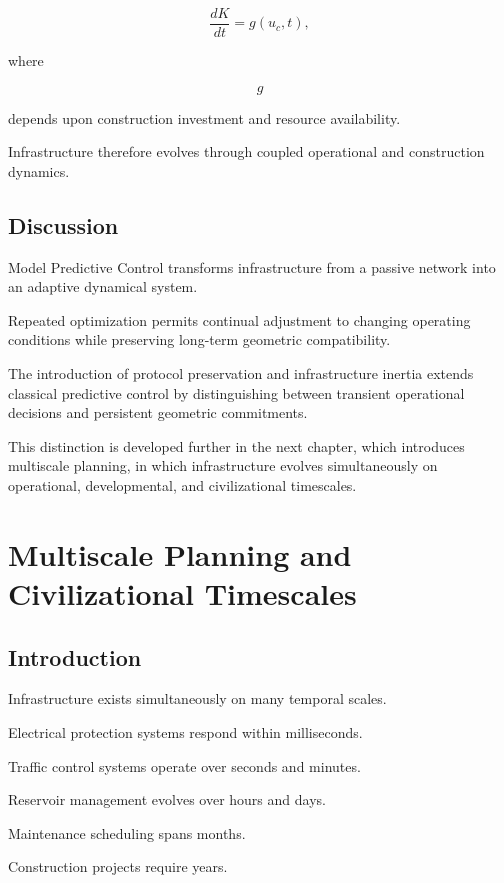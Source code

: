 \documentclass[11pt,fleqn]{book}
\numberwithin{equation}{chapter}
\theoremstyle{plain}
\theoremstyle{definition}
\theoremstyle{remark}
\begin{document}
\[
\frac{dK}{dt}
=
g(u_c,t),
\]

where

\[
g
\]

depends upon construction investment and resource availability.

Infrastructure therefore evolves through coupled operational and
construction dynamics.


\section{Discussion}

Model Predictive Control transforms infrastructure from a passive network
into an adaptive dynamical system.

Repeated optimization permits continual adjustment to changing operating
conditions while preserving long-term geometric compatibility.

The introduction of protocol preservation and infrastructure inertia
extends classical predictive control by distinguishing between transient
operational decisions and persistent geometric commitments.

This distinction is developed further in the next chapter, which introduces
multiscale planning, in which infrastructure evolves simultaneously on
operational, developmental, and civilizational timescales.

\chapter{Multiscale Planning and Civilizational Timescales}

\section{Introduction}

Infrastructure exists simultaneously on many temporal scales.

Electrical protection systems respond within milliseconds.

Traffic control systems operate over seconds and minutes.

Reservoir management evolves over hours and days.

Maintenance scheduling spans months.

Construction projects require years.
\end{document}
